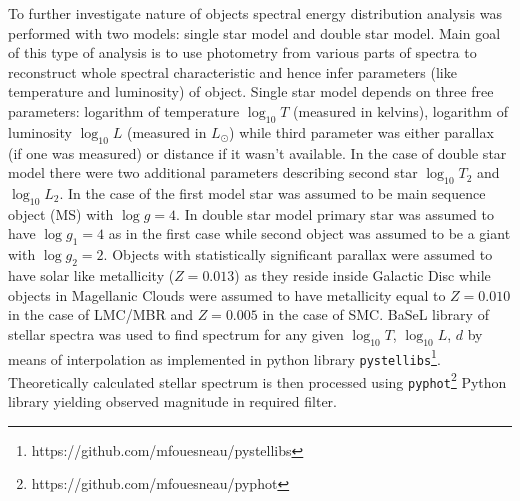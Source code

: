 \documentclass{pracalicmgr}
\begin{document}
To further investigate nature of objects spectral energy distribution analysis was 
performed with two models: single star model and double star model. Main goal of this type of analysis is to use photometry from various parts of spectra to
reconstruct whole spectral characteristic and hence infer parameters (like temperature and luminosity) of object.
Single star model depends on three free parameters: logarithm of temperature $\log_{10}T$ (measured in kelvins), logarithm of luminosity $\log_{10} L$ (measured in $L_{\odot}$) while third 
parameter was either parallax (if one was measured) or distance if it wasn't available. In the case of double star model there were two additional parameters describing 
second star $\log_{10} T_2$ and $\log_{10} L_2$. In the case of the first model star was assumed to be main sequence object (MS) with $\log{g}=4$. In double star model primary star 
was assumed to have $\log{g_1}=4$ as in the first case while second object was assumed to be a giant with $\log{g_2}=2$. Objects with statistically significant parallax were assumed to have 
solar like metallicity ($Z=0.013$) as they reside inside Galactic Disc while objects in Magellanic Clouds 
were assumed to have metallicity equal to $Z=0.010$ in the case of LMC/MBR and $Z=0.005$ in the case of SMC.
BaSeL library of stellar spectra \citep{lejeune_standard_1998} was used to find spectrum for any given $\log_{10}{T}$, $\log_{10} L$, $d$ 
by means of interpolation as implemented in python library
\texttt{pystellibs}\footnote{https://github.com/mfouesneau/pystellibs}.
Theoretically calculated stellar spectrum is then processed using \texttt{pyphot}\footnote{https://github.com/mfouesneau/pyphot} 
Python library yielding observed magnitude in required filter.
\end{document}

